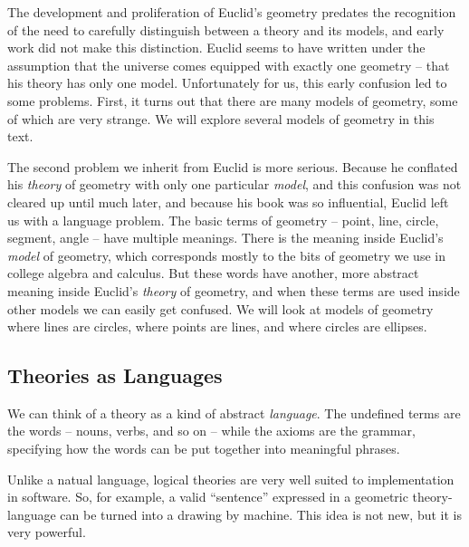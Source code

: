 The development and proliferation of Euclid's geometry predates the recognition of the need to carefully distinguish between a theory and its models, and early work did not make this distinction.
Euclid seems to have written under the assumption that the universe comes equipped with exactly one geometry -- that his theory has only one model.
Unfortunately for us, this early confusion led to some problems.
First, it turns out that there are many models of geometry, some of which are very strange.
We will explore several models of geometry in this text.

The second problem we inherit from Euclid is more serious.
Because he conflated his \emph{theory} of geometry with only one particular \emph{model}, and this confusion was not cleared up until much later, and because his book was so influential, Euclid left us with a language problem.
The basic terms of geometry -- point, line, circle, segment, angle -- have multiple meanings.
There is the meaning inside Euclid's \emph{model} of geometry, which corresponds mostly to the bits of geometry we use in college algebra and calculus.
But these words have another, more abstract meaning inside Euclid's \emph{theory} of geometry, and when these terms are used inside other models we can easily get confused.
We will look at models of geometry where lines are circles, where points are lines, and where circles are ellipses.

\subsection*{Theories as Languages}

We can think of a theory as a kind of abstract \emph{language}.
The undefined terms are the words -- nouns, verbs, and so on -- while the axioms are the grammar, specifying how the words can be put together into meaningful phrases.

Unlike a natual language, logical theories are very well suited to implementation in software.
So, for example, a valid ``sentence'' expressed in a geometric theory-language can be turned into a drawing by machine.
This idea is not new, but it is very powerful.
